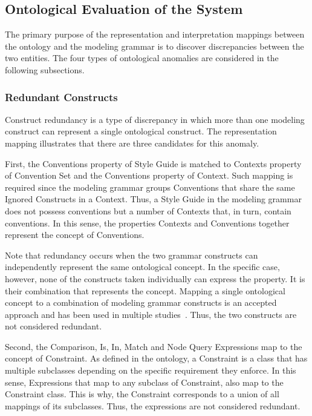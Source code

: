 \subsection{Ontological Evaluation of the System}

The primary purpose of the representation and interpretation mappings between
the ontology and the modeling grammar is to discover discrepancies between the
two entities. The four types of ontological anomalies are considered in the
following subsections.

\subsubsection{Redundant Constructs} 

Construct redundancy is a type of discrepancy in which more than one modeling
construct can represent a single ontological construct. The representation
mapping illustrates that there are three candidates for this anomaly.

First, the Conventions property of Style Guide is matched to Contexts property
of Convention Set and the Conventions property of Context. Such mapping is
required since the modeling grammar groups Conventions that share the same
Ignored Constructs in a Context. Thus, a Style Guide in the modeling grammar
does not possess conventions but a number of Contexts that, in turn, contain
conventions. In this sense, the properties Contexts and Conventions together
represent the concept of Conventions.

Note that redundancy occurs when the two grammar constructs can independently
represent the same ontological concept. In the specific case, however, none of
the constructs taken individually can express the property. It is their
combination that represents the concept. Mapping a single ontological concept
to a combination of modeling grammar constructs is an accepted approach and
has been used in multiple studies~\cite{gehlert2007toward}. Thus, the two
constructs are not considered redundant.

Second, the Comparison, Is, In, Match and Node Query Expressions map to the concept of Constraint.
As defined in the ontology, a Constraint is a class that has multiple subclasses depending on the
specific requirement they enforce. In this sense, Expressions that map to any subclass of
Constraint, also map to the Constraint class. This is why, the Constraint corresponds to a union of
all mappings of its subclasses. Thus, the expressions are not considered redundant.

